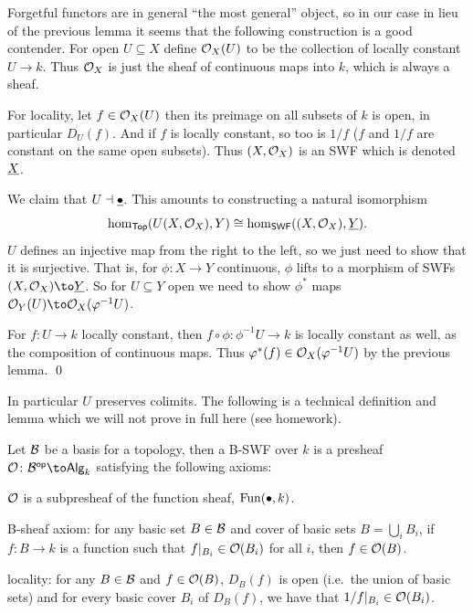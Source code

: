 \eprop

\bproof

    Forgetful functors are in general ``the most general'' object, so in our case in lieu of the previous lemma it seems that the following construction is a good contender.
    For open $U\subseteq X$ define ${{\cal O}}_X(U)$ to be the collection of locally constant $U\to k$.
    Thus ${{\cal O}}_X$ is just the sheaf of continuous maps into $k$, which is always a sheaf.

    For locality, let $f\in{{\cal O}}_X(U)$ then its preimage on all subsets of $k$ is open, in particular $D_U(f)$.
    And if $f$ is locally constant, so too is $1/f$ ($f$ and $1/f$ are constant on the same open subsets).
    Thus $(X,{{\cal O}}_X)$ is an SWF which is denoted ${\underline{X}}$.

    We claim that $U\dashv{\underline{\bullet}}$.
    This amounts to constructing a natural isomorphism
    $$ \hom_{\sf Top}(U(X,{{\cal O}}_X),Y) \cong \hom_{\sf SWF}((X,{{\cal O}}_X),{\underline{Y}}) . $$
    $U$ defines an injective map from the right to the left, so we just need to show that it is surjective.
    That is, for $\phi\colon X\to Y$ continuous, $\phi$ lifts to a morphism of SWFs $(X,\O_X)\to\ul Y$.
    So for $U\subseteq Y$ open we need to show $\phi^*$ maps $\O_Y(U)\to\O_X(\phi^{-1}U)$.

    For $f\colon U\to k$ locally constant, then $f\circ\phi\colon\phi^{-1}U\to k$ is locally constant as well, as the composition of continuous maps.
    Thus $\varphi^*(f)\in{{\cal O}}_X(\varphi^{-1}U)$ by the previous lemma.
    \qed

\eproof

In particular $U$ preserves colimits.
The following is a technical definition and lemma which we will not prove in full here (see homework).

\bdefn

    Let ${\cal B}$ be a basis for a topology, then a {\emphcolor B-SWF} over $k$ is a presheaf $\O\colon\c B^\op\to\Alg_k$ satisfying the following axioms:
    \benum
        \item ${{\cal O}}$ is a subpresheaf of the function sheaf, ${\rm Fun}(\bullet,k)$.
        \item {\emphcolor B-sheaf axiom}: for any basic set $B\in{\cal B}$ and cover of basic sets $B=\bigcup_iB_i$, if $f\colon B\to k$ is a function such that $f|_{B_i}\in{{\cal O}}(B_i)$
        for all $i$, then $f\in{{\cal O}}(B)$.
        \item {\emphcolor locality}: for any $B\in{\cal B}$ and $f\in{{\cal O}}(B)$, $D_B(f)$ is open (i.e.\ the union of basic sets) and for every basic cover $B_i$ of $D_B(f)$, we have that
        $1/f|_{B_i}\in{{\cal O}}(B_i)$.
    \eenum

